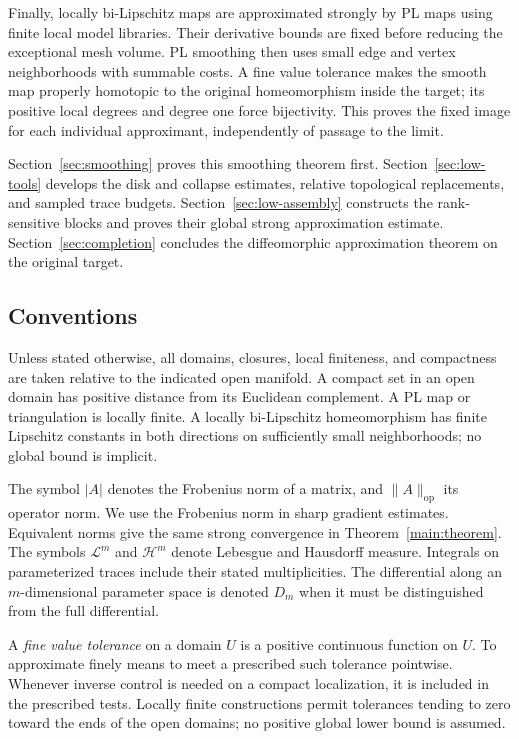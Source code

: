 \documentclass[11pt]{article}
\numberwithin{equation}{section}
\theoremstyle{definition}
\theoremstyle{remark}
\newcommand{\cH}{\mathcal H}
\newcommand{\cL}{\mathcal L}
\newcommand{\op}{\mathrm{op}}
\begin{document}
Finally, locally bi-Lipschitz maps are approximated strongly by PL
maps using finite local model libraries. Their derivative bounds are
fixed before reducing the exceptional mesh volume. PL smoothing
then uses small edge and vertex neighborhoods with summable costs.
A fine value tolerance makes the smooth map properly homotopic to
the original homeomorphism inside the target; its positive local
degrees and degree one force bijectivity. This proves the fixed
image for each individual approximant, independently of passage
to the limit.

Section~\ref{sec:smoothing} proves this smoothing theorem first.
Section~\ref{sec:low-tools} develops the disk and collapse estimates,
relative topological replacements, and sampled trace budgets.
Section~\ref{sec:low-assembly} constructs the rank-sensitive blocks
and proves their global strong approximation estimate.
Section~\ref{sec:completion} concludes the diffeomorphic
approximation theorem on the original target.

\subsection{Conventions}

Unless stated otherwise, all domains, closures, local finiteness, and compactness are taken relative to the indicated open manifold. A compact set in an open domain has positive distance from its Euclidean complement. A PL map or triangulation is locally finite. A locally bi-Lipschitz homeomorphism has finite Lipschitz constants in both directions on sufficiently small neighborhoods; no global bound is implicit.

The symbol $|A|$ denotes the Frobenius norm of a matrix, and $\|A\|_{\op}$ its operator norm. We use the Frobenius norm in sharp gradient estimates. Equivalent norms give the same strong convergence in Theorem~\ref{main:theorem}. The symbols $\cL^m$ and $\cH^m$ denote Lebesgue and Hausdorff measure. Integrals on parameterized traces include their stated multiplicities. The differential along an $m$-dimensional parameter space is denoted $D_m$ when it must be distinguished from the full differential.

A \emph{fine value tolerance} on a domain $U$ is a positive continuous function on $U$. To approximate finely means to meet a prescribed such tolerance pointwise. Whenever inverse control is needed on a compact localization, it is included in the prescribed tests. Locally finite constructions permit tolerances tending to zero toward the ends of the open domains; no positive global lower bound is assumed.
\end{document}
